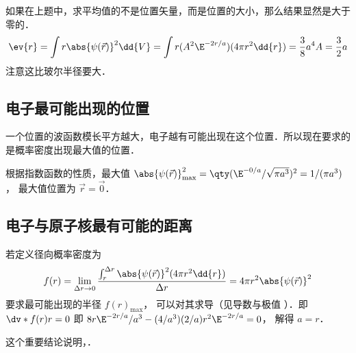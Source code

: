 如果在上题中，求平均值的不是位置矢量，而是位置的大小，那么结果显然是大于零的．
\begin{equation}
\ev{r} = \int r \abs{\psi (\vec r)}^2 \dd{V} = \int r (A^2 \E^{-2r/a})(4\pi r^2 \dd{r})= \frac{3}{8} a^4 A = \frac{3}{2}a
\end{equation}
注意这比玻尔半径要大．

\subsection{电子最可能出现的位置}

 一个位置的波函数模长平方越大，电子越有可能出现在这个位置．所以现在要求的是概率密度出现最大值的位置．
 
根据指数函数的性质，最大值 $\abs{\psi (\vec r)}_{\max}^2 = \qty( \E^{-0/a}/\sqrt{\pi a^3})^2 = 1/(\pi a^3)$， 最大值位置为 $\vec r = \vec 0$．

\subsection{电子与原子核最有可能的距离}
若定义径向概率密度为
\begin{equation}
f(r) = \lim_{\Delta r \to 0} \frac{\int_r^{\Delta r} {\abs{\psi (\vec r)}}^2 (4\pi r^2 \dd{r}) }{\Delta r} = 4\pi r^2 \abs{\psi(\vec r)}^2
\end{equation}
要求最可能出现的半径 $f(r)_{\max}$， 可以对其求导（见导数与极值%
）．即 $\dv*{f(r)}{r} = 0$ 即 $8 r \E^{-2r/a}/a^3 - (4/a^3)(2/a)r^2 \E^{-2r/a} = 0$， 解得 $a = r$． 
 
这个重要结论说明，．
